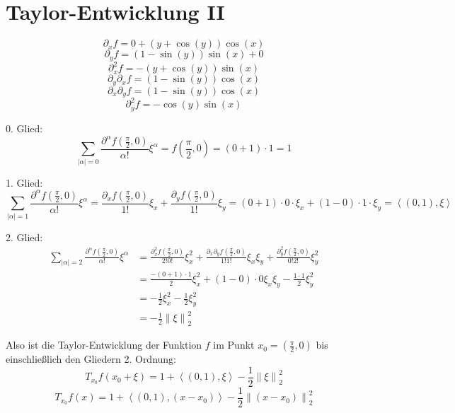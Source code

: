 \documentclass[sectionformat=aufgabe]{gadsescript}
\begin{document}
\section{Taylor-Entwicklung II}
\[
	\partial_x f = 0 + (y + \cos (y)) \cos (x)
\]
\[
	\partial_y f = (1 - \sin (y)) \sin (x) + 0
\]
\[
	\partial_x^2 f = - (y + \cos (y)) \sin (x)
\]
\[
	\partial_y\partial_x f = (1 - \sin (y)) \cos (x)
\]
\[
	\partial_x\partial_y f = (1 - \sin (y)) \cos (x)
\]
\[
	\partial_y^2 f = - \cos (y) \sin (x)
\]

0. Glied:
\[
	\sum_{\left| \alpha \right| = 0}^{} \frac{ \partial^{\alpha} f\left( \frac{ \pi }{ 2 } , 0 \right)  }{ \alpha! } \xi^{\alpha} = f\left( \frac{ \pi }{ 2 } , 0 \right)  = (0 + 1) \cdot 1 = 1
\]

1. Glied:
\[
	\sum_{\left| \alpha \right| = 1}^{} \frac{ \partial^{\alpha} f\left( \frac{ \pi }{ 2 } , 0 \right)  }{ \alpha! } \xi^{\alpha}
	= \frac{ \partial_x f\left( \frac{ \pi }{ 2 } , 0 \right) }{ 1! } \xi_x
	+ \frac{ \partial_y f\left( \frac{ \pi }{ 2 } , 0 \right) }{ 1! } \xi_y
	= (0 + 1) \cdot 0 \cdot \xi_x + (1 - 0) \cdot 1 \cdot \xi_y = \left< (0, 1), \xi \right>
\]

2. Glied:
\begin{align*}
	\sum_{\left| \alpha \right| = 2}^{} \frac{ \partial^{\alpha} f\left( \frac{ \pi }{ 2 } , 0 \right)  }{ \alpha! } \xi^{\alpha}
	&= \frac{ \partial_x^2 f\left( \frac{ \pi }{ 2 } , 0 \right) }{ 2!0! } \xi_x^2
	+ \frac{ \partial_x\partial_y f\left( \frac{ \pi }{ 2 } , 0 \right) }{ 1!1! } \xi_x\xi_y
	+ \frac{ \partial_y^2 f\left( \frac{ \pi }{ 2 } , 0 \right) }{ 0!2! } \xi_y^2 \\
	&= \frac{ - (0 + 1) \cdot 1 }{ 2 } \xi_x^2 + (1 - 0) \cdot 0 \xi_x\xi_y - \frac{ 1 \cdot 1 }{ 2 } \xi_y^2 \\
	&= -\frac{ 1 }{ 2 } \xi_x^2 - \frac{ 1 }{ 2 } \xi_y^2 \\
	&= - \frac{ 1 }{ 2 } \left\| \xi \right\| _2^2
\end{align*}

Also ist die Taylor-Entwicklung der Funktion $ f $ im Punkt $ x_0 = \left( \frac{ \pi }{ 2 } , 0 \right)  $ bis einschließlich den Gliedern 2. Ordnung:
\[
	T_{x_0} f(x_0 + \xi) = 1 + \left< (0, 1), \xi \right> - \frac{ 1 }{ 2 } \left\| \xi \right\| _2^2
\]
\[
	T_{x_0} f(x) = 1 + \left< (0, 1), (x - x_0) \right> - \frac{ 1 }{ 2 } \left\| (x - x_0) \right\| _2^2
\]
\end{document}

